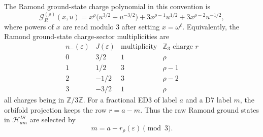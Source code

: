 \documentclass[11pt]{article}
\newcommand{\Z}{\mathbb{Z}}
\newcommand{\cH}{\mathcal{H}}
\begin{document}
The Ramond ground-state charge polynomial in this convention is
\begin{equation}
  \mathcal G_R^{(\rho)}(x,u)
  =
  x^\rho\bigl(u^{3/2}+u^{-3/2}\bigr)
  +
  3x^{\rho-1}u^{1/2}
  +
  3x^{\rho-2}u^{-1/2},
  \label{eq:R-ground-state-polynomial}
\end{equation}
where powers of \(x\) are read modulo \(3\) after setting \(x=\omega^\ell\). Equivalently, the
Ramond ground-state charge-sector multiplicities are
\begin{equation}
  \begin{array}{c|c|c|c}
  n_-(\varepsilon) & J(\varepsilon) & \text{multiplicity} & \Z_3\text{ charge }r \\
  \hline
  0 & 3/2 & 1 & \rho \\
  1 & 1/2 & 3 & \rho-1 \\
  2 & -1/2 & 3 & \rho-2 \\
  3 & -3/2 & 1 & \rho
  \end{array}
  \label{eq:R-ground-state-charge-table}
\end{equation}
all charges being in \(\Z/3\Z\). For a fractional ED3 of label \(a\) and a D7 label \(m\), the
orbifold projection keeps the row \(r=a-m\). Thus the raw Ramond ground states in
\(\cH^{IS}_{a m}\) are selected by
\begin{equation}
  m=a-r_\rho(\varepsilon)\pmod 3.
  \label{eq:R-ground-state-fractional-selection}
\end{equation}
\end{document}
